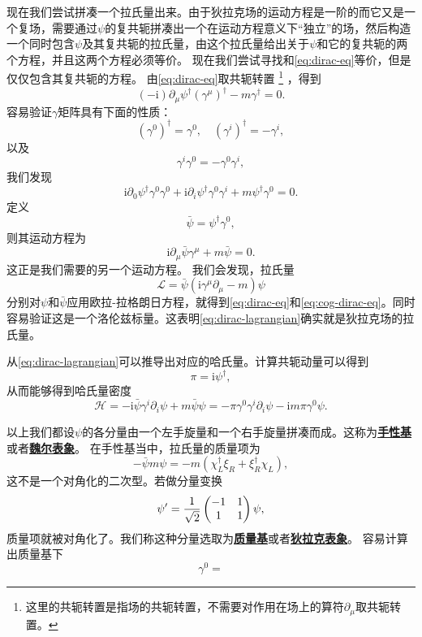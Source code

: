 \documentclass[hyperref, UTF8, a4paper]{ctexart}
\newcommand*{\ii}{\mathrm{i}}
\newcommand{\concept}[1]{\underline{\textbf{#1}}}
\begin{document}
现在我们尝试拼凑一个拉氏量出来。由于狄拉克场的运动方程是一阶的而它又是一个复场，需要通过$\psi$的复共轭拼凑出一个在运动方程意义下“独立”的场，然后构造一个同时包含$\psi$及其复共轭的拉氏量，由这个拉氏量给出关于$\psi$和它的复共轭的两个方程，并且这两个方程必须等价。
现在我们尝试寻找和\eqref{eq:dirac-eq}等价，但是仅仅包含其复共轭的方程。
由\eqref{eq:dirac-eq}取共轭转置%
\footnote{这里的共轭转置是指场的共轭转置，不需要对作用在场上的算符$\partial_\mu$取共轭转置。}
，得到
\[
    (-\ii) \partial_\mu \psi^\dagger (\gamma^\mu)^\dagger - m \gamma^\dagger = 0.
\]
容易验证$\gamma$矩阵具有下面的性质：
\[
    (\gamma^0)^\dagger = \gamma^0, \quad (\gamma^i)^\dagger = - \gamma^i, 
\]
以及
\[
    \gamma^i \gamma^0 = - \gamma^0 \gamma^i,
\]
我们发现
\[
    \ii \partial_0 \psi^\dagger \gamma^0 \gamma^0 + \ii \partial_i \psi^\dagger \gamma^0 \gamma^i + m \psi^\dagger \gamma^0 = 0.
\]
定义
\begin{equation}
    \bar{\psi} = \psi^\dagger \gamma^0,
\end{equation}
则其运动方程为
\begin{equation}
    \ii \partial_\mu \bar{\psi} \gamma^\mu + m \bar{\psi} = 0.
    \label{eq:cog-dirac-eq}
\end{equation}
这正是我们需要的另一个运动方程。
我们会发现，拉氏量
\begin{equation}
    \mathcal{L} = \bar{\psi} (\ii \gamma^\mu \partial_\mu - m) \psi
    \label{eq:dirac-lagrangian}
\end{equation}
分别对$\psi$和$\bar{\psi}$应用欧拉-拉格朗日方程，就得到\eqref{eq:dirac-eq}和\eqref{eq:cog-dirac-eq}。同时容易验证这是一个洛伦兹标量。这表明\eqref{eq:dirac-lagrangian}确实就是狄拉克场的拉氏量。

从\eqref{eq:dirac-lagrangian}可以推导出对应的哈氏量。计算共轭动量可以得到
\begin{equation}
    \pi = \ii \psi^\dagger,
\end{equation}
从而能够得到哈氏量密度
\begin{equation}
    \mathcal{H} = - \ii \bar{\psi} \gamma^i \partial_i \psi  + m \bar{\psi} \psi = - \pi \gamma^0 \gamma^i \partial_i \psi - \ii m \pi \gamma^0 \psi.
\end{equation}

以上我们都设$\psi$的各分量由一个左手旋量和一个右手旋量拼凑而成。这称为\concept{手性基}或者\concept{魏尔表象}。
在手性基当中，拉氏量的质量项为
\[
    - \bar{\psi} m \psi = - m (\chi_L^\dagger \xi_R + \xi_R^\dagger \chi_L),
\]
这不是一个对角化的二次型。若做分量变换
\begin{equation}
    \psi' = \frac{1}{\sqrt{2}} \pmqty{-1 & 1 \\ 1 & 1} \psi,
\end{equation}
质量项就被对角化了。我们称这种分量选取为\concept{质量基}或者\concept{狄拉克表象}。
容易计算出质量基下
\begin{equation}
    \gamma^0 = 
\end{equation}
\end{document}
